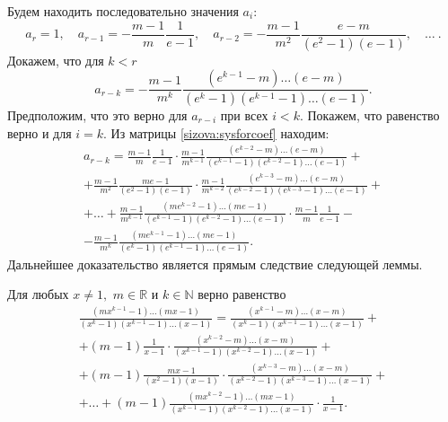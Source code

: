 Будем находить последовательно значения $a_i$:
$$
a_r = 1, \quad a_{r - 1} = -\frac{m - 1}{m} \frac{1}{e - 1}, \quad a_{r - 2} = -\frac{m - 1}{m^2} \frac{e - m}{\left(e^{2} - 1\right)(e - 1)}, \quad \ldots~ .$$
Докажем, что для $k < r$
$$
a_{r - k} = -\frac{m - 1}{m^k} \frac{\left(e^{k - 1} - m\right)\ldots(e - m)}{\left(e^{k} - 1\right)\left(e^{k - 1} - 1\right)\ldots(e - 1)}.
$$
Предположим, что это верно для $a_{r - i}$ при всех $i < k$. Покажем, что равенство верно и для $i=k$. Из матрицы \eqref{sizova:sysforcoef} находим:
\begin{multline*}
a_{r - k} = \frac{m - 1}{m}\frac{1}{e - 1}\cdot\frac{m - 1}{m^{k - 1}} \frac{\left(e^{k - 2} - m\right)\ldots\left(e - m\right)}{\left(e^{k - 1} - 1\right)\left(e^{k - 2} - 1\right)\ldots\left(e - 1\right)} +\\
+ \frac{m - 1}{m^2} \frac{me - 1}{\left(e^{2} - 1\right)\left(e - 1\right)}\cdot\frac{m - 1}{m^{k - 2}} \frac{\left(e^{k - 3} - m\right)\ldots(e - m)}{\left(e^{k - 2} - 1\right)\left(e^{k - 3} - 1\right)\ldots\left(e - 1\right)} +\\
+ \ldots + \frac{m - 1}{m^{k - 1}}\frac{\left(me^{k - 2} - 1\right)\ldots(me - 1)}{\left(e^{k - 1} - 1\right)\left(e^{k - 2} - 1\right)\ldots(e - 1)}\cdot\frac{m - 1}{m} \frac{1}{e - 1} -\\
-\frac{m - 1}{m^k}\frac{\left(me^{k - 1} - 1\right)\ldots(me - 1)}{\left(e^{k} - 1\right)\left(e^{k - 1} - 1\right)\ldots(e - 1)}.
\end{multline*}
Дальнейшее доказательство является прямым следствие следующей леммы.

\smallskip

\begin{lemma}
Для любых $x \ne 1,$ $m \in \mathbb R$ и $k \in \mathbb N$ верно равенство
\begin{multline*}
\frac{\left(mx^{k - 1} - 1\right)\ldots\left(mx -
1\right)}{\left(x^k - 1\right)\left(x^{k - 1} - 1\right)\ldots(x -
1)} = \frac{\left(x^{k - 1} - m\right)\ldots(x - m)}{\left(x^k -
1\right)\left(x^{k - 1} - 1\right)\ldots (x - 1)} +\\
+ (m - 1)\frac{1}{x - 1}\cdot \frac{\left(x^{k - 2} -
m\right)\ldots (x - m)}{\left(x^{k - 1} - 1\right)\left(x^{k - 2}
- 1\right)\ldots (x - 1)} +\\
+ (m - 1) \frac{mx - 1}{\left(x^2 - 1\right) (x -
1)}\cdot\frac{\left(x^{k - 3} - m\right)\ldots (x - m)}{\left(x^{k
- 2} - 1\right)\left(x^{k - 3} - 1\right)\ldots (x - 1)} + \\
+ \ldots +  (m - 1)\frac{\left(mx^{k - 2} - 1\right)\ldots (mx -
1)}{\left(x^{k - 1} - 1\right)\left(x^{k - 2} - 1\right)\ldots (x
- 1 )}\cdot\frac{1}{x - 1}.
\end{multline*}
\end{lemma}

